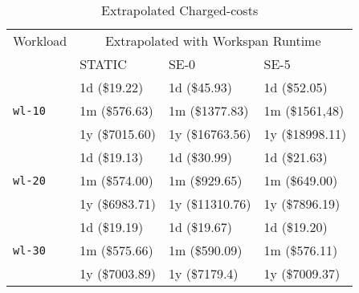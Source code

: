 


\begin{table}
\caption{Extrapolated Charged-costs}
\label{table_extrapolatedchargedcosts}
\centering
\begin{tabular}{|l|l|l|l|}
\hline
Workload & \multicolumn{3}{|c|}{Extrapolated with Workspan Runtime}\\
\cline{2-4}
 & STATIC & SE-0 & SE-5 \\
\hline
\multirow{3}{*}{\texttt{wl-10}}
 & 1d (\$19.22) & 1d (\$45.93) & 1d (\$52.05) \\
 & 1m (\$576.63) & 1m (\$1377.83) & 1m (\$1561,48) \\
 & 1y (\$7015.60) & 1y (\$16763.56) & 1y (\$18998.11) \\
\hline
\multirow{3}{*}{\texttt{wl-20}}
 & 1d (\$19.13) & 1d (\$30.99) & 1d (\$21.63) \\
 & 1m (\$574.00) & 1m (\$929.65) & 1m (\$649.00) \\
 & 1y (\$6983.71) & 1y (\$11310.76) & 1y (\$7896.19)\\
\hline
\multirow{3}{*}{\texttt{wl-30}}
 & 1d (\$19.19) & 1d (\$19.67) & 1d (\$19.20) \\ 
 & 1m (\$575.66) & 1m (\$590.09) & 1m (\$576.11) \\
 & 1y (\$7003.89) & 1y (\$7179.4) & 1y (\$7009.37) \\
\hline
\end{tabular}
\end{table}
